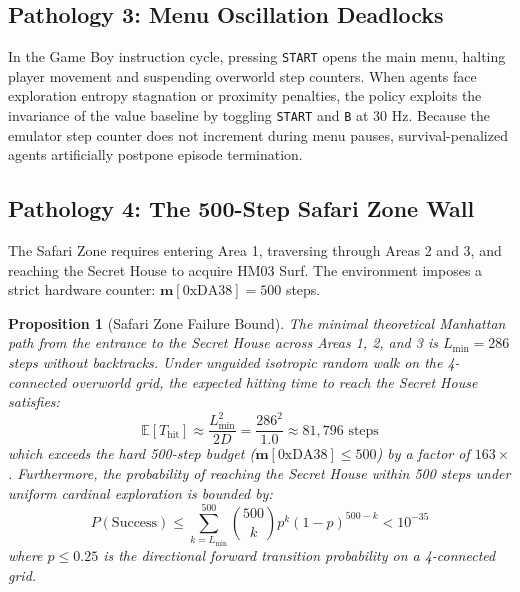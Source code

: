 \documentclass[journal,10pt,twocolumn]{IEEEtran}
\newtheorem{proposition}{Proposition}
\begin{document}
\subsection{Pathology 3: Menu Oscillation Deadlocks}
In the Game Boy instruction cycle, pressing \texttt{START} opens the main menu, halting player movement and suspending overworld step counters. When agents face exploration entropy stagnation or proximity penalties, the policy exploits the invariance of the value baseline by toggling \texttt{START} and \texttt{B} at 30 Hz. Because the emulator step counter does not increment during menu pauses, survival-penalized agents artificially postpone episode termination.

\subsection{Pathology 4: The 500-Step Safari Zone Wall}
The Safari Zone requires entering Area 1, traversing through Areas 2 and 3, and reaching the Secret House to acquire HM03 Surf. The environment imposes a strict hardware counter: $\mathbf{m}[\text{0xDA38}] = 500$ steps.
\begin{proposition}[Safari Zone Failure Bound]
\label{prop:safari_zone}
The minimal theoretical Manhattan path from the entrance to the Secret House across Areas 1, 2, and 3 is $L_{\min} = 286$ steps without backtracks. Under unguided isotropic random walk on the 4-connected overworld grid, the expected hitting time to reach the Secret House satisfies:
\begin{equation}
\mathbb{E}[T_{\text{hit}}] \approx \frac{L_{\min}^2}{2D} = \frac{286^2}{1.0} \approx 81{,}796 \text{ steps}
\end{equation}
which exceeds the hard 500-step budget ($\mathbf{m}[\text{0xDA38}] \le 500$) by a factor of $163\times$. Furthermore, the probability of reaching the Secret House within 500 steps under uniform cardinal exploration is bounded by:
\begin{equation}
P(\text{Success}) \le \sum_{k=L_{\min}}^{500} \binom{500}{k} p^k (1-p)^{500 - k} < 10^{-35}
\end{equation}
where $p \le 0.25$ is the directional forward transition probability on a 4-connected grid.
\end{proposition}
\end{document}
